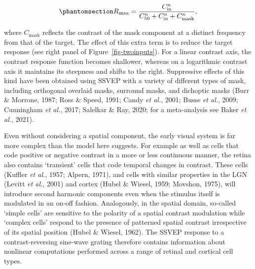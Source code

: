 \documentclass[
  letterpaper,
  DIV=11,
  numbers=noendperiod]{scrartcl}
\begin{document}
\begin{equation}\phantomsection\label{eq-gaincontrol}{R_{\mathrm{max}} = \frac{C_{\mathrm{in}}^n}{C_{50}^n + C_{\mathrm{in}}^n + C_{\mathrm{mask}}^n},}\end{equation}

where \(C_\mathrm{mask}\) reflects the contrast of the mask component at
a distinct frequency from that of the target. The effect of this extra
term is to reduce the target response (see right panel of
Figure~\ref{fig-twoinputs}). For a linear contrast axis, the contrast
response function becomes shallower, whereas on a logarithmic contrast
axis it maintains its steepness and shifts to the right. Suppressive
effects of this kind have been obtained using SSVEP with a variety of
different types of mask, including orthogonal overlaid masks, surround
masks, and dichoptic masks (Burr \& Morrone, 1987; Ross \& Speed, 1991;
Candy \emph{et al.}, 2001; Busse \emph{et al.}, 2009; Cunningham
\emph{et al.}, 2017; Salelkar \& Ray, 2020; for a meta-analysis see
Baker \emph{et al.}, 2021).

Even without considering a spatial component, the early visual system is
far more complex than the model here suggests. For example as well as
cells that code positive or negative contrast in a more or less
continuous manner, the retina also contains `transient' cells that code
temporal changes in contrast. These cells (Kuffler \emph{et al.}, 1957;
Alpern, 1971), and cells with similar properties in the LGN (Levitt
\emph{et al.}, 2001) and cortex (Hubel \& Wiesel, 1959; Movshon, 1975),
will introduce second harmonic components even when the stimulus itself
is modulated in an on-off fashion. Analogously, in the spatial domain,
so-called `simple cells' are sensitive to the polarity of a spatial
contrast modulation while `complex cells' respond to the presence of
patterned spatial contrast irrespective of its spatial position (Hubel
\& Wiesel, 1962). The SSVEP response to a contrast-reversing sine-wave
grating therefore contains information about nonlinear computations
performed across a range of retinal and cortical cell types.
\end{document}

